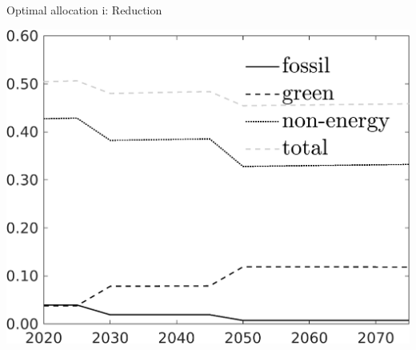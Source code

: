 \documentclass[11pt,aspectratio=169]{beamer}
\begin{document}
\begin{frame}{Optimal allocation i: Reduction}
\begin{minipage}[]{0.32\textwidth}
	\end{minipage}
\begin{minipage}[]{0.32\textwidth}
	\includegraphics[width=1\textwidth]{../codding_model/own_basedOnFried/optimalPol_elastS_DisuSci/figures/all_1705/SingleJointTOT_OPT_T_NoTaus_Science_spillover0_sep1_BN1_ineq0_red0_etaa0.79_lgd1.png}
\end{minipage}
\end{frame}
\end{document}
